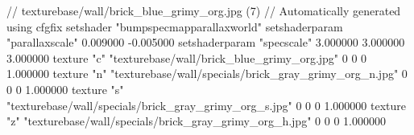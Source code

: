 // texturebase/wall/brick_blue_grimy_org.jpg (7)
// Automatically generated using cfgfix
setshader "bumpspecmapparallaxworld"
setshaderparam "parallaxscale" 0.009000 -0.005000
setshaderparam "specscale" 3.000000 3.000000 3.000000
texture "c" "texturebase/wall/brick_blue_grimy_org.jpg" 0 0 0 1.000000
texture "n" "texturebase/wall/specials/brick_gray_grimy_org_n.jpg" 0 0 0 1.000000
texture "s" "texturebase/wall/specials/brick_gray_grimy_org_s.jpg" 0 0 0 1.000000
texture "z" "texturebase/wall/specials/brick_gray_grimy_org_h.jpg" 0 0 0 1.000000
